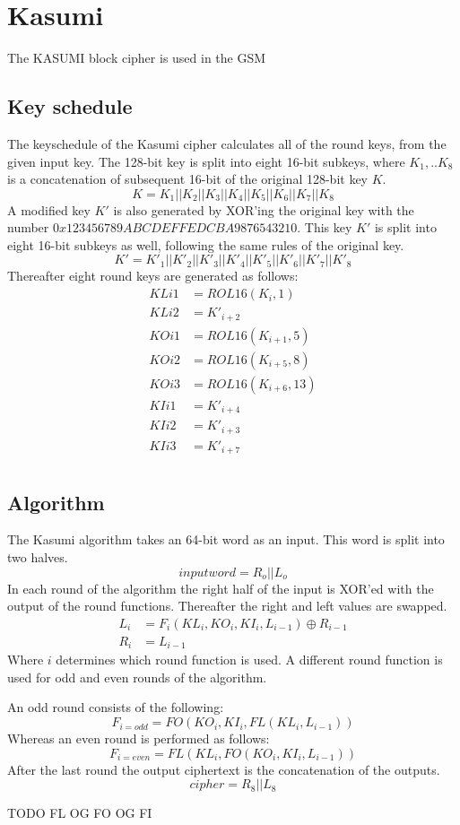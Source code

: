 \chapter{Kasumi}
The KASUMI block cipher is used in the GSM 
\section{Key schedule}
The keyschedule of the Kasumi cipher calculates all of the round keys,
from the given input key. The 128-bit key is split into eight 16-bit
subkeys, where $K_1,..K_8$ is a concatenation of subsequent 16-bit of
the original 128-bit key $K$.
\[K = K_1 || K_2 || K_3 || K_4 || K_5 || K_6 || K_7 || K_8\]
A modified key $K'$ is also generated by XOR'ing the original key with
the number $0x123456789ABCDEFFEDCBA9876543210$. This key $K'$ is split
into eight 16-bit subkeys as well, following the same rules of the
original key.
\[K' = K'_1 || K'_2 || K'_3 || K'_4 || K'_5 || K'_6 || K'_7 || K'_8\]
Thereafter eight round keys are generated as follows:
\begin{align*}
  KLi1 &= ROL16(K_i,1)\\
  KLi2 &= K'_{i+2}\\
  KOi1 &= ROL16(K_{i + 1},5)\\
  KOi2 &= ROL16(K_{i + 5},8)\\
  KOi3 &= ROL16(K_{i + 6},13)\\
  KIi1 &= K'_{i+4}\\
  KIi2 &= K'_{i+3}\\
  KIi3 &= K'_{i+7}\\
\end{align*}

\section{Algorithm}
The Kasumi algorithm takes an 64-bit word as an input. This word is
split into two halves.
\[ inputword = R_o || L_o\]
In each round of the algorithm the right half of the input is XOR'ed
with the output of the round functions. Thereafter the right and left
values are swapped. 
\begin{align*}
  L_i &= F_i(KL_i,KO_i,KI_i,L_{i - 1}) \oplus R_{i - 1} \\
  R_i &= L_{i - 1}
\end{align*}
Where $i$ determines which round function is used. A different round
function is used for odd and even rounds of the algorithm.

An odd round consists of the following:
\[F_{i = odd} = FO(KO_i, KI_i, FL(KL_i, L_{i - 1})) \]
Whereas an even round is performed as follows:
\[F_{i = even} = FL(KL_i, FO(KO_i,KI_i, L_{i - 1})) \]
After the last round the output ciphertext is the concatenation of the
outputs.
\[cipher = R_8 || L_8\]

TODO
FL OG FO OG FI

